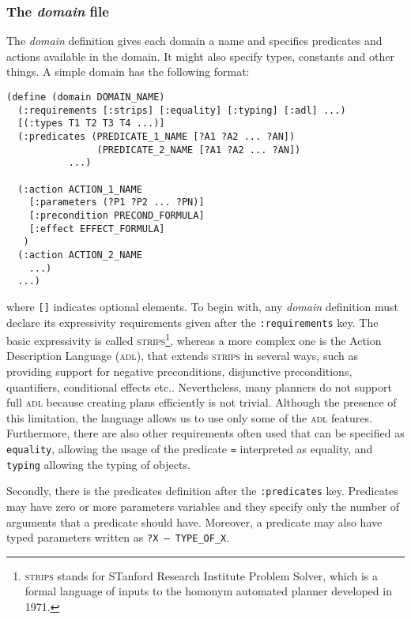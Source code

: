 \subsubsection{The \textit{domain} file} 
The \textit{domain} definition gives each domain a name and specifies predicates and actions available in the domain. It might also specify types, constants and other things. A simple domain has the following format:
\begin{lstlisting}[language=PDDL, escapechar=£, label={code:pddl-domain}]
(define (domain DOMAIN_NAME)
  (:requirements [:strips] [:equality] [:typing] [:adl] ...)
  [(:types T1 T2 T3 T4 ...)]
  (:predicates (PREDICATE_1_NAME [?A1 ?A2 ... ?AN])
                (PREDICATE_2_NAME [?A1 ?A2 ... ?AN])
	       ...)

  (:action ACTION_1_NAME
    [:parameters (?P1 ?P2 ... ?PN)]
    [:precondition PRECOND_FORMULA]
    [:effect EFFECT_FORMULA]
   )
  (:action ACTION_2_NAME
    ...)
  ...)  
\end{lstlisting}
where \texttt{[]} indicates optional elements. To begin with, any \PDDL \textit{domain} definition must declare its expressivity requirements given after the \texttt{:requirements} key. The basic \PDDL expressivity is called \textsc{strips}\footnote{\textsc{strips} stands for STanford Research Institute Problem Solver, which is a formal language of inputs to the homonym automated planner developed in 1971.}, whereas a more complex one is the Action Description Language (\textsc{adl}), that extends \textsc{strips} in several ways, such as providing support for negative preconditions, disjunctive preconditions, quantifiers, conditional effects etc.. Nevertheless, many planners do not support full \textsc{adl} because creating plans efficiently is not trivial. Although the presence of this limitation, the \PDDL language allows us to use only some of the \textsc{adl} features. Furthermore, there are also other requirements often used that can be specified as \texttt{equality}, allowing the usage of the predicate \texttt{=} interpreted as equality, and \texttt{typing} allowing the typing of objects. 

Secondly, there is the predicates definition after the \texttt{:predicates} key. Predicates may have zero or more parameters variables and they specify only the number of arguments that a predicate should have. Moreover, a predicate may also have typed parameters written as \texttt{?X -- TYPE\_OF\_X}.

